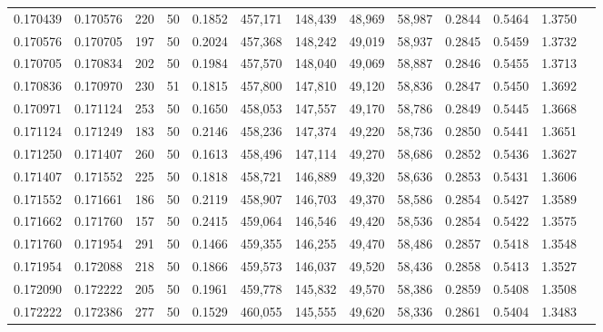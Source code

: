 \begin{tabular}{rrrrrrrrrrrrr}
0.170439 & 0.170576 &   220 &  50 &                                     0.1852 & 457,171 & 148,439 &  48,969 &  58,987 & 0.2844 & 0.5464 & 1.3750 \\
0.170576 & 0.170705 &   197 &  50 &                                     0.2024 & 457,368 & 148,242 &  49,019 &  58,937 & 0.2845 & 0.5459 & 1.3732 \\
0.170705 & 0.170834 &   202 &  50 &                                     0.1984 & 457,570 & 148,040 &  49,069 &  58,887 & 0.2846 & 0.5455 & 1.3713 \\
0.170836 & 0.170970 &   230 &  51 &                                     0.1815 & 457,800 & 147,810 &  49,120 &  58,836 & 0.2847 & 0.5450 & 1.3692 \\
0.170971 & 0.171124 &   253 &  50 &                                     0.1650 & 458,053 & 147,557 &  49,170 &  58,786 & 0.2849 & 0.5445 & 1.3668 \\
0.171124 & 0.171249 &   183 &  50 &                                     0.2146 & 458,236 & 147,374 &  49,220 &  58,736 & 0.2850 & 0.5441 & 1.3651 \\
0.171250 & 0.171407 &   260 &  50 &                                     0.1613 & 458,496 & 147,114 &  49,270 &  58,686 & 0.2852 & 0.5436 & 1.3627 \\
0.171407 & 0.171552 &   225 &  50 &                                     0.1818 & 458,721 & 146,889 &  49,320 &  58,636 & 0.2853 & 0.5431 & 1.3606 \\
0.171552 & 0.171661 &   186 &  50 &                                     0.2119 & 458,907 & 146,703 &  49,370 &  58,586 & 0.2854 & 0.5427 & 1.3589 \\
0.171662 & 0.171760 &   157 &  50 &                                     0.2415 & 459,064 & 146,546 &  49,420 &  58,536 & 0.2854 & 0.5422 & 1.3575 \\
0.171760 & 0.171954 &   291 &  50 &                                     0.1466 & 459,355 & 146,255 &  49,470 &  58,486 & 0.2857 & 0.5418 & 1.3548 \\
0.171954 & 0.172088 &   218 &  50 &                                     0.1866 & 459,573 & 146,037 &  49,520 &  58,436 & 0.2858 & 0.5413 & 1.3527 \\
0.172090 & 0.172222 &   205 &  50 &                                     0.1961 & 459,778 & 145,832 &  49,570 &  58,386 & 0.2859 & 0.5408 & 1.3508 \\
0.172222 & 0.172386 &   277 &  50 &                                     0.1529 & 460,055 & 145,555 &  49,620 &  58,336 & 0.2861 & 0.5404 & 1.3483 \\

\end{tabular}

